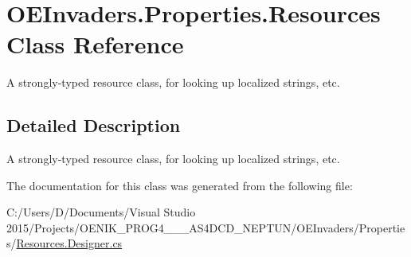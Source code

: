 \hypertarget{class_o_e_invaders_1_1_properties_1_1_resources}{}\section{O\+E\+Invaders.\+Properties.\+Resources Class Reference}
\label{class_o_e_invaders_1_1_properties_1_1_resources}


A strongly-\/typed resource class, for looking up localized strings, etc.  




\subsection{Detailed Description}
A strongly-\/typed resource class, for looking up localized strings, etc. 



The documentation for this class was generated from the following file\+:\begin{DoxyCompactItemize}
\item 
C\+:/\+Users/\+D/\+Documents/\+Visual Studio 2015/\+Projects/\+O\+E\+N\+I\+K\+\_\+\+P\+R\+O\+G4\+\_\+\_\+\_\+\+A\+S4\+D\+C\+D\+\_\+\+N\+E\+P\+T\+U\+N/\+O\+E\+Invaders/\+Properties/\mbox{\hyperlink{_resources_8_designer_8cs}{Resources.\+Designer.\+cs}}\end{DoxyCompactItemize}
